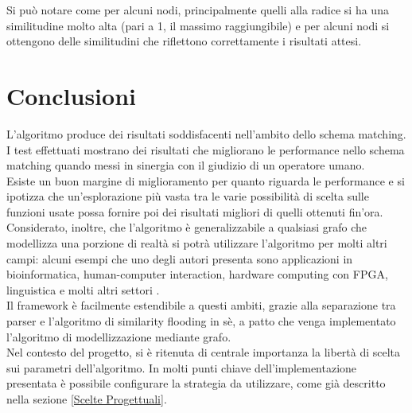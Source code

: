 \documentclass{article}
\begin{document}
\newpage

Si può notare come per alcuni nodi, principalmente quelli alla radice si ha una similitudine molto alta (pari a 1, il massimo raggiungibile) e per alcuni nodi si ottengono delle similitudini che riflettono correttamente i risultati attesi.\\


\section{Conclusioni}

L’algoritmo produce dei risultati soddisfacenti nell’ambito dello schema matching. I test effettuati mostrano dei risultati che migliorano le performance nello schema matching quando messi in sinergia con il giudizio di un operatore umano.\\

Esiste un buon margine di miglioramento per quanto riguarda le performance e si ipotizza che un'esplorazione più vasta tra le varie possibilità di scelta sulle funzioni usate possa fornire poi dei risultati migliori di quelli ottenuti fin'ora.\\

Considerato, inoltre, che l’algoritmo è generalizzabile a qualsiasi grafo che modellizza una porzione di realtà si potrà utilizzare l’algoritmo per molti altri campi: alcuni esempi che uno degli autori presenta sono applicazioni in bioinformatica, human-computer interaction, hardware computing con FPGA, linguistica e molti altri settori \cite{decade_after_flooding}.\\

Il framework è facilmente estendibile a questi ambiti, grazie alla separazione tra parser e l’algoritmo di similarity flooding in sè, a patto che venga implementato l’algoritmo di modellizzazione mediante grafo.\\

Nel contesto del progetto, si è ritenuta di centrale importanza la libertà di scelta sui parametri dell’algoritmo. In molti punti chiave dell’implementazione presentata è possibile configurare la strategia da utilizzare, come già descritto nella sezione \ref{Scelte Progettuali}.






\end{document}
